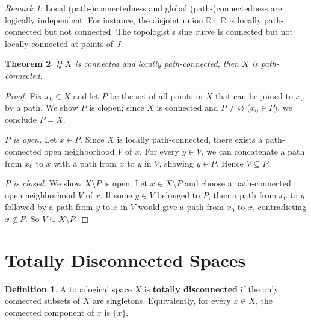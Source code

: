 \documentclass[11pt,a4paper,twoside]{book}
\newtheorem{theorem}{Theorem}[section]
\theoremstyle{remark}
\newtheorem{remark}[theorem]{Remark}
\theoremstyle{definition}
\theoremstyle{definition}
\newtheorem{definition}{Definition}[section]
\begin{document}
\begin{remark}\label{rem:local-vs-global}
Local (path-)connectedness and global (path-)connectedness are
logically independent.  For instance, the disjoint union
$\mathbb{R}\sqcup\mathbb{R}$ is locally path-connected but not
connected.  The topologist's sine curve is connected but not
locally connected at points of $J$.
\end{remark}

\begin{theorem}\label{thm:connected-lpc-implies-pc}
If $X$ is connected and locally path-connected, then $X$ is
path-connected.
\end{theorem}

\begin{proof}
Fix $x_0\in X$ and let $P$ be the set of all points in $X$ that
can be joined to $x_0$ by a path.  We show $P$ is clopen; since
$X$ is connected and $P\neq\varnothing$ ($x_0\in P$), we conclude
$P=X$.

\emph{$P$ is open.}\; Let $x\in P$.  Since $X$ is locally
path-connected, there exists a path-connected open neighborhood $V$
of $x$.  For every $y\in V$, we can concatenate a path from $x_0$
to $x$ with a path from $x$ to $y$ in $V$, showing $y\in P$.
Hence $V\subseteq P$.

\emph{$P$ is closed.}\; We show $X\setminus P$ is open.  Let
$x\in X\setminus P$ and choose a path-connected open neighborhood
$V$ of $x$.  If some $y\in V$ belonged to $P$, then a path from
$x_0$ to $y$ followed by a path from $y$ to $x$ in $V$ would give
a path from $x_0$ to $x$, contradicting $x\notin P$.  So
$V\subseteq X\setminus P$.
\end{proof}


\section{Totally Disconnected Spaces}
\label{sec:totally-disconnected}

\begin{definition}\label{def:totally-disconnected}
A topological space $X$ is \textbf{totally disconnected} if the only
connected subsets of $X$ are singletons.  Equivalently, for every
$x\in X$, the connected component of $x$ is $\{x\}$.
\end{definition}
\end{document}
